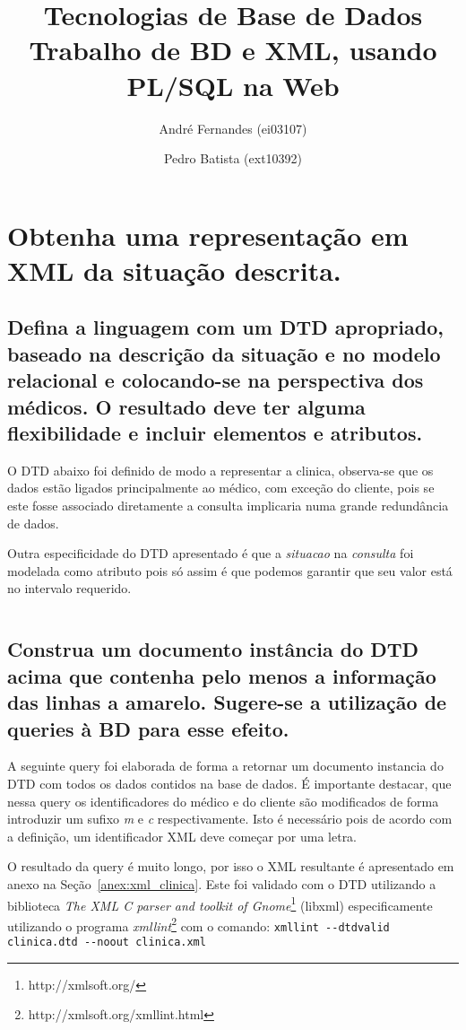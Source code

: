 \documentclass[a4paper,12pt]{article}
\title{Tecnologias de Base de Dados\\
\Large{Trabalho de BD e XML, usando PL/SQL na Web}}
\author{André Fernandes (ei03107) \and Pedro Batista (ext10392)}
\begin{document}
\maketitle

\section{Obtenha uma representação em XML da situação descrita.}
\subsection{Defina a linguagem com um DTD apropriado, baseado na descrição da
situação e no modelo relacional e colocando-se na perspectiva dos médicos. O
resultado deve ter alguma flexibilidade e incluir elementos e atributos.}

O DTD abaixo foi definido de modo a representar a clinica, observa-se que os
dados estão ligados principalmente ao médico, com exceção do cliente, pois se
este fosse associado diretamente a consulta implicaria numa grande redundância
de dados.

Outra especificidade do DTD apresentado é que a \emph{situacao} na
\emph{consulta} foi modelada como atributo pois só assim é que podemos garantir
que seu valor está no intervalo requerido.

\inputminted{xml}{clinica.dtd}

\subsection{Construa um documento instância do DTD acima que contenha pelo menos a
informação das linhas a amarelo. Sugere-se a utilização de queries à BD para
esse efeito.}

A seguinte query foi elaborada de forma a retornar um documento instancia do DTD
com todos os dados contidos na base de dados. É importante destacar, que nessa
query os identificadores do médico e do cliente são modificados de forma introduzir
um sufixo \emph{m} e \emph{c} respectivamente. Isto é necessário pois de acordo
com a definição, um identificador XML deve começar por uma letra.

O resultado da query é muito longo, por isso o XML resultante é apresentado em
anexo na Seção~\ref{anex:xml_clinica}. Este foi validado com o DTD utilizando a
biblioteca \emph{The XML C parser and toolkit of
Gnome}\footnote{http://xmlsoft.org/} (libxml) especificamente utilizando o programa
\emph{xmllint}\footnote{http://xmlsoft.org/xmllint.html} com o comando:
\verb~xmllint --dtdvalid clinica.dtd --noout clinica.xml~
\end{document}
